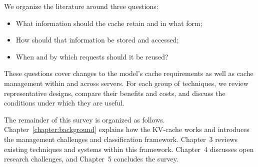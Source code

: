 We organize the literature around three questions: 
\begin{itemize}
    \item What information should the cache retain and in what form; 
    \item How should that information be stored and accessed; 
    \item When and by which requests should it be reused?
\end{itemize}
These questions cover changes to the model's cache requirements as well as cache management within and across servers. For each group of techniques, we review representative designs, compare their benefits and costs, and discuss the conditions under which they are useful.

The remainder of this survey is organized as follows. Chapter~\ref{chapter:background} explains how the KV-cache works and introduces the management challenges and classification framework. Chapter~3 reviews existing techniques and systems within this framework. Chapter~4 discusses open research challenges, and Chapter~5 concludes the survey.

